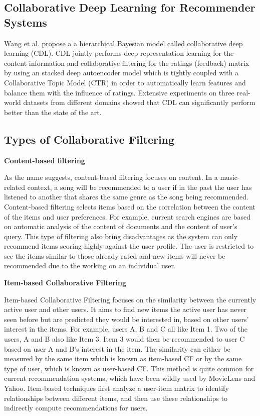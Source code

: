 \documentclass{article} %
\begin{document}
\subsection{Collaborative Deep Learning for Recommender Systems}

Wang et al. \cite{wang2015collaborative} propose a a hierarchical Bayesian model called collaborative deep learning (CDL). CDL jointly performs deep representation learning for the content information and collaborative filtering for the ratings (feedback) matrix by using an stacked deep autoencoder model which is tightly coupled with a Collaborative Topic Model (CTR) in order to automatically learn features and balance them with the influence of ratings. Extensive experiments on three real-world datasets from different domains showed that CDL can significantly perform better than the state of the art.

\subsection{Types of Collaborative Filtering \cite{ho2007hybrid}}

\textbf{Content-based filtering}

As the name suggests, content-based filtering focuses on content. In a music-related context, a song will be recommended to a user if in the past the user has listened to another that shares the same genre as the song being recommended. Content-based filtering selects items based on the correlation between the content of the items and user preferences. For example, current search engines are based on automatic analysis of the content of documents and the content of user’s query. This type of filtering also bring disadvantages as the system can only recommend items scoring highly against the user profile. The user is restricted to see the items similar to those already rated and new items will never be recommended due to the working on an individual user.

\textbf{Item-based Collaborative Filtering}

Item-based Collaborative Filtering focuses on the similarity between the currently active user and other users. It aims to find new items the active user has never seen before but are predicted they would be interested in, based on other users' interest in the items. For example, users A, B and C all like Item 1. Two of the users, A and B also like Item 3. Item 3 would then be recommended to user C based on user A and B's interest in the item. The similarity can either be measured by the same item which is known as item-based CF or by the same type of user, which is known as user-based CF. This method is quite common for current recommendation systems, which have been wildly used by MovieLens and Yahoo. Item-based techniques first analyze a user-item matrix to identify relationships between different items, and then use these relationships to indirectly compute recommendations for users.
\end{document}

